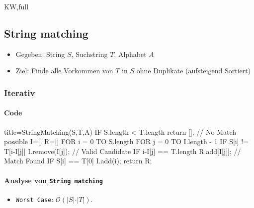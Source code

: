\documentclass[
    ngerman,
    color=3b,
    dark_mode,
    summary,
    boxarc,
]{rubos-tuda-template}
\begin{document}
\begin{taggedblock}{KW,full}
    \subsection{String matching}\label{StringMatching}
    \begin{idea}\mbox{}
        \begin{itemize}
            \item Gegeben: String $S$, Suchstring $T$, Alphabet $A$
            \item Ziel: Finde alle Vorkommen von $T$ in $S$ ohne Duplikate (aufsteigend Sortiert)
        \end{itemize}
    \end{idea}

    \subsubsection{Iterativ}
    \paragraph{Code}\mbox{}

    \begin{codeBlock}[autogobble]{title={StringMatching(S,T,A)}}
        IF S.length < T.length
            return [];                // No Match possible
        I=[]
        R=[]
        FOR i = 0 TO S.length
            FOR j = 0 TO I.length - 1
                IF S[i] != T[i-I[j]]
                    I.remove(I[j]);   // Valid Candidate
                IF i-I[j] == T.length
                    R.add[I[j]];      // Match Found
            IF S[i] == T[0]
                I.add(i);
        return R;
    \end{codeBlock}
    \paragraph{Analyse von \texttt{String matching}}
    \begin{description}[leftmargin=5cm,itemsep=1em]
        \item [Komplexität]
              \begin{itemize}
                  \item \texttt{Worst Case}: $\mathcal{O}(\vert S\vert\cdot\vert T\vert)$.
              \end{itemize}
    \end{description}

\end{taggedblock}
\end{document}
